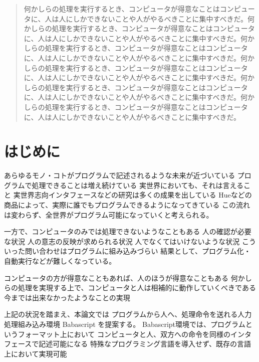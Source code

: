 \begin{abstract}

何かしらの処理を実行するとき、コンピュータが得意なことはコンピュータに、人は人にしかできないことや人がやるべきことに集中すべきだ。何かしらの処理を実行するとき、コンピュータが得意なことはコンピュータに、人は人にしかできないことや人がやるべきことに集中すべきだ。何かしらの処理を実行するとき、コンピュータが得意なことはコンピュータに、人は人にしかできないことや人がやるべきことに集中すべきだ。何かしらの処理を実行するとき、コンピュータが得意なことはコンピュータに、人は人にしかできないことや人がやるべきことに集中すべきだ。何かしらの処理を実行するとき、コンピュータが得意なことはコンピュータに、人は人にしかできないことや人がやるべきことに集中すべきだ。何かしらの処理を実行するとき、コンピュータが得意なことはコンピュータに、人は人にしかできないことや人がやるべきことに集中すべきだ。

\end{abstract}

\maketitle

\section{はじめに}\label{ux306fux3058ux3081ux306b}

あらゆるモノ・コトがプログラムで記述されるような未来が近づいている
プログラムで処理できることは増え続けている
実世界においても、それは言えること
実世界志向インタフェースなどの研究は多くの成果を出している
Hueなどの商品によって、実際に誰でもプログラムできるようになってきている
この流れは変わらず、全世界がプログラム可能になっていくと考えられる。

一方で、コンピュータのみでは処理できないようなこともある
人の確認が必要な状況 人の意志の反映が求められる状況
人でなくてはいけないような状況
こういった問い合わせはプログラムに組み込みづらい
結果として、プログラム化・自動実行などが難しくなっている。

コンピュータの方が得意なこともあれば、人のほうが得意なこともある
何かしらの処理を実現する上で、コンピュータと人は相補的に動作していくべきである
今までは出来なかったようなことの実現

上記の状況を踏まえ、本論文では
プログラムから人へ、処理命令を送れる人力処理組み込み環境 Babascript
を提案する。 Babascript環境では、プログラムというフォーマット上において
コンピュータと人、双方への命令を同様のインタフェースで記述可能になる
特殊なプログラミング言語を導入せず、既存の言語上において実現可能

